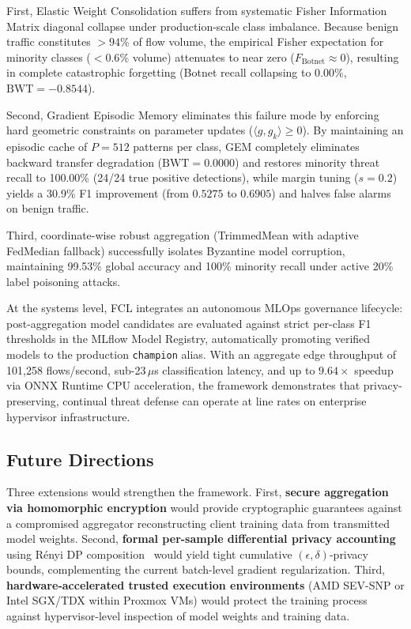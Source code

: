 \documentclass[journal,10pt,twocolumn]{IEEEtran}
\begin{document}
First, Elastic Weight Consolidation suffers from systematic Fisher Information Matrix diagonal collapse under production-scale class imbalance. Because benign traffic constitutes $>94\%$ of flow volume, the empirical Fisher expectation for minority classes ($<0.6\%$ volume) attenuates to near zero ($F_{\text{Botnet}} \approx 0$), resulting in complete catastrophic forgetting (Botnet recall collapsing to 0.00\%, $\text{BWT} = -0.8544$).

Second, Gradient Episodic Memory eliminates this failure mode by enforcing hard geometric constraints on parameter updates ($\langle g, g_k \rangle \ge 0$). By maintaining an episodic cache of $P=512$ patterns per class, GEM completely eliminates backward transfer degradation ($\text{BWT} = 0.0000$) and restores minority threat recall to 100.00\% (24/24 true positive detections), while margin tuning ($s=0.2$) yields a 30.9\% F1 improvement (from $0.5275$ to $0.6905$) and halves false alarms on benign traffic.

Third, coordinate-wise robust aggregation (TrimmedMean with adaptive FedMedian fallback) successfully isolates Byzantine model corruption, maintaining 99.53\% global accuracy and 100\% minority recall under active 20\% label poisoning attacks.

At the systems level, FCL integrates an autonomous MLOps governance lifecycle: post-aggregation model candidates are evaluated against strict per-class F1 thresholds in the MLflow Model Registry, automatically promoting verified models to the production \texttt{champion} alias. With an aggregate edge throughput of 101,258 flows/second, sub-23\,$\mu$s classification latency, and up to $9.64\times$ speedup via ONNX Runtime CPU acceleration, the framework demonstrates that privacy-preserving, continual threat defense can operate at line rates on enterprise hypervisor infrastructure.

\subsection{Future Directions}
\label{sec:future}
Three extensions would strengthen the framework. First, \textbf{secure aggregation via homomorphic encryption} would provide cryptographic guarantees against a compromised aggregator reconstructing client training data from transmitted model weights. Second, \textbf{formal per-sample differential privacy accounting} using Rényi DP composition~\cite{abadi2016deep} would yield tight cumulative $(\epsilon, \delta)$-privacy bounds, complementing the current batch-level gradient regularization. Third, \textbf{hardware-accelerated trusted execution environments} (AMD SEV-SNP or Intel SGX/TDX within Proxmox VMs) would protect the training process against hypervisor-level inspection of model weights and training data.



\end{document}
